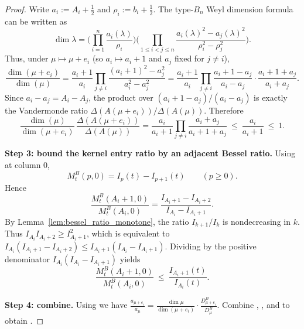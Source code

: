 \begin{proof}
Write $a_i:=A_i+\tfrac12$ and $\rho_i:=b_i+\tfrac12$.
The type-$B_n$ Weyl dimension formula can be written as
\begin{equation}
\label{eq:SOodd_dim_formula}
\dim\lambda
=\Bigg(\prod_{i=1}^n \frac{a_i(\lambda)}{\rho_i}\Bigg)
\Bigg(\prod_{1\le i<j\le n}\frac{a_i(\lambda)^2-a_j(\lambda)^2}{\rho_i^2-\rho_j^2}\Bigg).
\end{equation}
Thus, under $\mu\mapsto\mu+e_i$ (so $a_i\mapsto a_i+1$ and $a_j$ fixed for $j\ne i$),
\begin{equation}
\label{eq:SOodd_dim_ratio}
\frac{\dim(\mu+e_i)}{\dim(\mu)}
=\frac{a_i+1}{a_i}\prod_{j\ne i}\frac{(a_i+1)^2-a_j^2}{a_i^2-a_j^2}
=\frac{a_i+1}{a_i}\prod_{j\ne i}\frac{a_i+1-a_j}{a_i-a_j}\cdot\frac{a_i+1+a_j}{a_i+a_j}.
\end{equation}
Since $a_i-a_j=A_i-A_j$, the product over $(a_i+1-a_j)/(a_i-a_j)$ is exactly the Vandermonde ratio
$\Delta(A(\mu+e_i))/\Delta(A(\mu))$.
Therefore
\begin{equation}
\label{eq:SOodd_dim_cancel}
\frac{\dim(\mu)}{\dim(\mu+e_i)}\,\frac{\Delta(A(\mu+e_i))}{\Delta(A(\mu))}
=\frac{a_i}{a_i+1}\prod_{j\ne i}\frac{a_i+a_j}{a_i+1+a_j}\ \le\ \frac{a_i}{a_i+1}\ \le\ 1.
\end{equation}

\textbf{Step 3: bound the kernel entry ratio by an adjacent Bessel ratio.}
Using  at column $0$,
\begin{equation}
\label{eq:SOodd_col0_entries}
M_t^{B}(p,0)=I_p(t)-I_{p+1}(t)\qquad(p\ge 0).
\end{equation}
Hence
\begin{equation}
\label{eq:SOodd_Mratio}
\frac{M_t^{B}(A_i+1,0)}{M_t^{B}(A_i,0)}
=\frac{I_{A_i+1}-I_{A_i+2}}{I_{A_i}-I_{A_i+1}}.
\end{equation}
By Lemma~\ref{lem:bessel_ratio_monotone}, the ratio $I_{k+1}/I_k$ is nondecreasing in $k$.
Thus $I_{A_i}I_{A_i+2}\ge I_{A_i+1}^2$, which is equivalent to
$I_{A_i}(I_{A_i+1}-I_{A_i+2})\le I_{A_i+1}(I_{A_i}-I_{A_i+1})$.
Dividing by the positive denominator $I_{A_i}(I_{A_i}-I_{A_i+1})$ yields
\begin{equation}
\label{eq:SOodd_Mratio_bound}
\frac{M_t^{B}(A_i+1,0)}{M_t^{B}(A_i,0)}\ \le\ \frac{I_{A_i+1}(t)}{I_{A_i}(t)}.
\end{equation}

\textbf{Step 4: combine.}
Using  we have
$\frac{a_{\mu+e_i}}{a_{\mu}}=\frac{\dim\mu}{\dim(\mu+e_i)}\cdot\frac{D^{B}_{\mu+e_i}}{D^{B}_{\mu}}$.
Combine , , and  to obtain
.
\end{proof}

